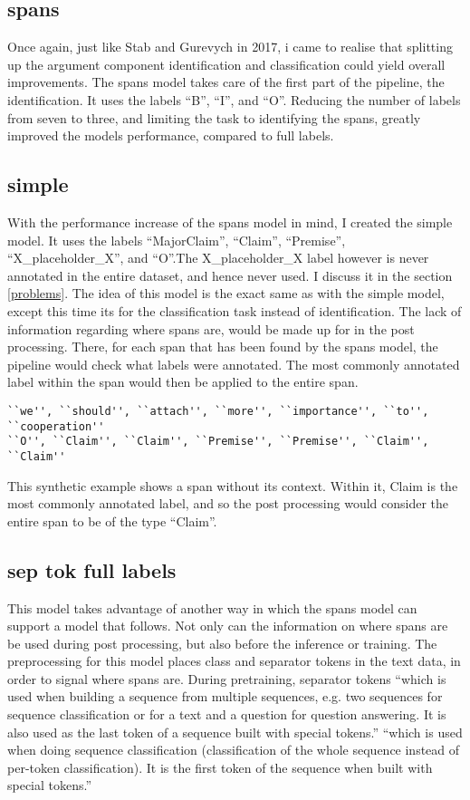 \documentclass[12]{article}
\theoremstyle{mytheoremstyle}
\theoremstyle{mytheoremstyle}
\theoremstyle{myproblemstyle}
\begin{document}
  \subsection{spans}
  Once again, just like Stab and Gurevych in 2017, i came to realise that splitting up the argument component identification and classification could yield overall improvements. The spans model takes care of the first part of the pipeline, the identification. It uses the labels ``B'', ``I'', and ``O''. Reducing the number of labels from seven to three, and limiting the task to identifying the spans, greatly improved the models performance, compared to full labels.
  \subsection{simple}
  With the performance increase of the spans model in mind, I created the simple model. It uses the labels ``MajorClaim'', ``Claim'', ``Premise'', ``X\_placeholder\_X'', and ``O''.The X\_placeholder\_X label however is never annotated in the entire dataset, and hence never used. I discuss it in the section \ref{problems}.
 The idea of this model is the exact same as with the simple model, except this time its for the classification task instead of identification. The lack of information regarding where spans are, would be made up for in the post processing. There, for each span that has been found by the spans model, the pipeline would check what labels were annotated. The most commonly annotated label within the span would then be applied to the entire span.  
  \begin{verbatim}
``we'', ``should'', ``attach'', ``more'', ``importance'', ``to'', ``cooperation''
``O'', ``Claim'', ``Claim'', ``Premise'', ``Premise'', ``Claim'', ``Claim''
  \end{verbatim}
  This synthetic example shows a span without its context. Within it, Claim is the most commonly annotated label, and so the post processing would consider the entire span to be of the type ``Claim''.
  \subsection{sep tok full labels}
  This model takes advantage of another way in which the spans model can support a model that follows. Not only can the information on where spans are be used during post processing, but also before the inference or training. The preprocessing for this model places class and separator tokens in the text data, in order to signal where spans are. During pretraining, separator tokens ``which is used when building a sequence from multiple sequences, e.g. two sequences for sequence classification or for a text and a question for question answering. It is also used as the last token of a sequence built with special tokens.'' ``which is used when doing sequence classification (classification of the whole sequence instead of per-token classification). It is the first token of the sequence when built with special tokens.''
\end{document}
